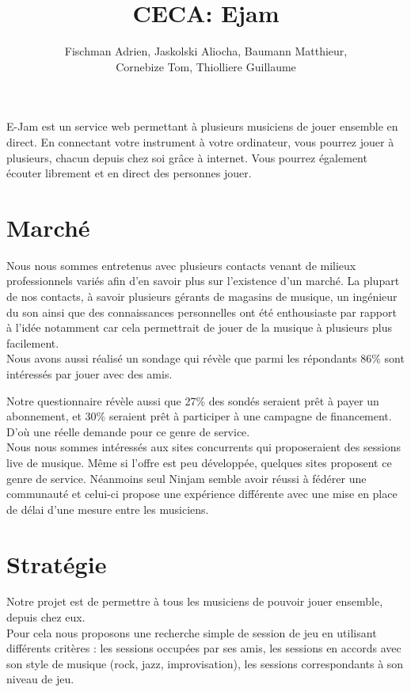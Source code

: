 \documentclass[a4,12pt]{article}
\title{CECA: Ejam}
\author{Fischman Adrien, Jaskolski Aliocha, Baumann Matthieur,\\ Cornebize Tom, Thiolliere Guillaume}
\begin{document}
\maketitle

E-Jam est un service web permettant à plusieurs musiciens de jouer ensemble en direct.
En connectant votre instrument à votre ordinateur, vous pourrez jouer à plusieurs,
chacun depuis chez soi grâce à internet.
Vous pourrez également écouter librement et en direct des personnes jouer.

\section{Marché}

Nous nous sommes entretenus avec plusieurs contacts venant de milieux professionnels
variés afin d’en savoir plus sur l’existence d’un marché.
La plupart de nos contacts, à savoir plusieurs gérants de magasins
de musique, un ingénieur du son ainsi que des connaissances personnelles ont été
enthousiaste par rapport à l'idée notamment car cela permettrait de jouer de la musique
à plusieurs plus facilement.
\\

Nous avons aussi réalisé un sondage qui révèle que parmi les répondants
86\% sont intéressés par jouer avec des amis.

Notre questionnaire révèle aussi que 27\% des sondés seraient prêt à payer un abonnement,
et 30\% seraient prêt à participer à une campagne de financement.
D'où une réelle demande pour ce genre de service.
\\

Nous nous sommes intéressés aux sites concurrents qui proposeraient des sessions
live de musique. Même si l’offre est peu développée, quelques sites proposent ce genre de service.
Néanmoins seul Ninjam semble avoir réussi à fédérer une communauté et celui-ci propose une expérience
différente avec une mise en place de délai d'une mesure entre les musiciens.
\\

\section{Stratégie}

Notre projet est de permettre à tous les musiciens de pouvoir jouer ensemble,
depuis chez eux.
\\

Pour cela nous proposons une recherche simple de session de jeu en utilisant différents critères :
les sessions occupées par ses amis,
les sessions en accords avec son style de musique (rock, jazz, improvisation),
les sessions correspondants à son niveau de jeu.\\
\end{document}
